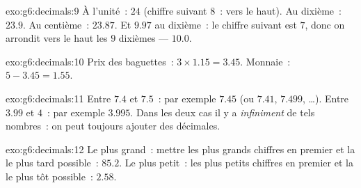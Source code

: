 \begin{solution}{exo:g6:decimals:9}
À l'unité~: $24$ (chiffre suivant $8$~:  vers le haut). Au
dixième~: $23.9$. Au centième~: $23.87$. Et $9.97$ au dixième~: le
chiffre suivant est $7$, donc on arrondit vers le haut les $9$
dixièmes --- $10.0$.
\end{solution}

\begin{solution}{exo:g6:decimals:10}
Prix des baguettes~: $3 \times 1.15 = 3.45$. Monnaie~:
$5 - 3.45 = 1.55$.
\end{solution}

\begin{solution}{exo:g6:decimals:11}
Entre $7.4$ et $7.5$~: par exemple $7.45$ (ou $7.41$, $7.499$,
\dots). Entre $3.99$ et $4$~: par exemple $3.995$. Dans les deux cas
il y a \emph{infiniment} de tels nombres~: on peut toujours ajouter
des décimales.
\end{solution}

\begin{solution}{exo:g6:decimals:12}
Le plus grand~: mettre les plus grands chiffres en premier et la
 le plus tard possible~: $85.2$. Le plus petit~: les plus
petits chiffres en premier et la  le plus tôt possible~:
$2.58$.
\end{solution}

